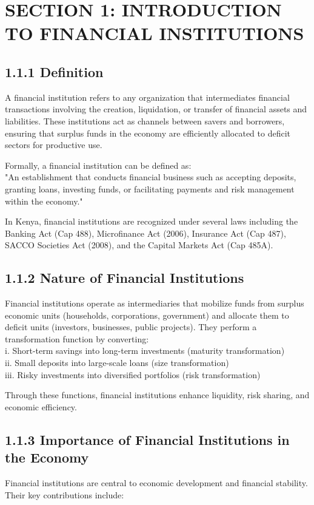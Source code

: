 \documentclass[10pt]{article}
\begin{document}
\section*{SECTION 1: INTRODUCTION TO FINANCIAL INSTITUTIONS}
\subsection*{1.1.1 Definition}
A financial institution refers to any organization that intermediates financial transactions involving the creation, liquidation, or transfer of financial assets and liabilities. These institutions act as channels between savers and borrowers, ensuring that surplus funds in the economy are efficiently allocated to deficit sectors for productive use.

Formally, a financial institution can be defined as:\\
"An establishment that conducts financial business such as accepting deposits, granting loans, investing funds, or facilitating payments and risk management within the economy."

In Kenya, financial institutions are recognized under several laws including the Banking Act (Cap 488), Microfinance Act (2006), Insurance Act (Cap 487), SACCO Societies Act (2008), and the Capital Markets Act (Cap 485A).

\subsection*{1.1.2 Nature of Financial Institutions}
Financial institutions operate as intermediaries that mobilize funds from surplus economic units (households, corporations, government) and allocate them to deficit units (investors, businesses, public projects). They perform a transformation function by converting:\\
i. Short-term savings into long-term investments (maturity transformation)\\
ii. Small deposits into large-scale loans (size transformation)\\
iii. Risky investments into diversified portfolios (risk transformation)

Through these functions, financial institutions enhance liquidity, risk sharing, and economic efficiency.

\subsection*{1.1.3 Importance of Financial Institutions in the Economy}
Financial institutions are central to economic development and financial stability. Their key contributions include:
\end{document}
